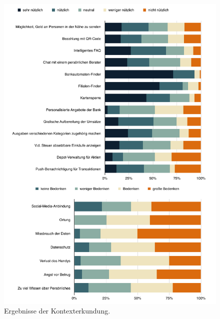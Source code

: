 \begin{figure}[p]
	\centering
	\includegraphics[scale=.69]{Pictures/Kontexterkundung}
	\caption{Ergebnisse der Kontexterkundung.}
\end{figure}